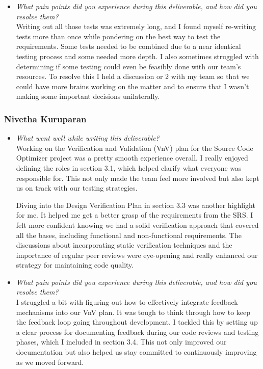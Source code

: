 \documentclass[12pt, titlepage]{article}
\begin{document}
\begin{enumerate}[label={\bf \textcolor{Maroon}{test-SRT-\arabic*}}, wide=0pt, font=\itshape]
\begin{appendices}
\begin{itemize}
  \item \textit{What pain points did you experience during this deliverable, and how did you resolve them?}\\
  
  Writing out all those tests was extremely long, and I found myself re-writing tests more than once while pondering on the best way to test the requirements. Some tests needed to be combined due to a near identical testing process and some needed more depth. I also sometimes struggled with determining if some testing could even be feasibly done with our team's resources. To resolve this I held a discussion or 2 with my team so that we could have more brains working on the matter and to ensure that I wasn't making some important decisions unilaterally.
\end{itemize}

\subsubsection*{Nivetha Kuruparan}
\begin{itemize}
  \item \textit{What went well while writing this deliverable?} \\
  
    Working on the Verification and Validation (VnV) plan for the Source Code Optimizer project was a pretty smooth experience overall. I really enjoyed defining the roles in section 3.1, which helped clarify what everyone was responsible for. This not only made the team feel more involved but also kept us on track with our testing strategies.
    
    Diving into the Design Verification Plan in section 3.3 was another highlight for me. It helped me get a better grasp of the requirements from the SRS. I felt more confident knowing we had a solid verification approach that covered all the bases, including functional and non-functional requirements. The discussions about incorporating static verification techniques and the importance of regular peer reviews were eye-opening and really enhanced our strategy for maintaining code quality.

  \item \textit{What pain points did you experience during this deliverable, and how did you resolve them?}\\

  I struggled a bit with figuring out how to effectively integrate feedback mechanisms into our VnV plan. It was tough to think through how to keep the feedback loop going throughout development. I tackled this by setting up a clear process for documenting feedback during our code reviews and testing phases, which I included in section 3.4. This not only improved our documentation but also helped us stay committed to continuously improving as we moved forward.
  

\end{itemize}
\end{appendices}
\end{enumerate}
\end{document}
